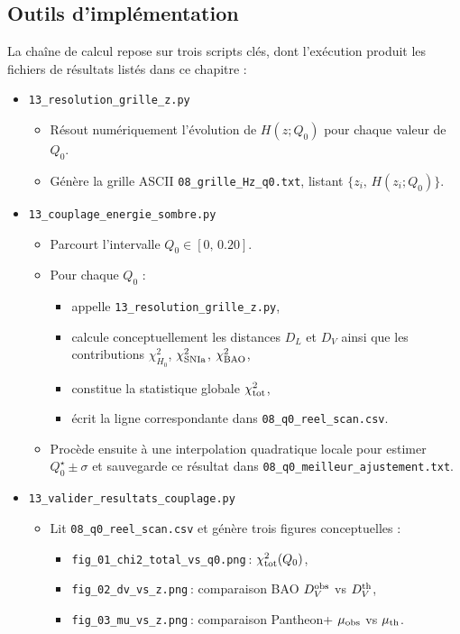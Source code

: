\subsection{Outils d’implémentation}

La chaîne de calcul repose sur trois scripts clés, dont l’exécution produit les fichiers de résultats listés dans ce chapitre :

\begin{itemize}
  \item \texttt{13\_resolution\_grille\_z.py}  
    \begin{itemize}
      \item Résout numériquement l’évolution de \(H(z;Q_{0})\) pour chaque valeur de \(Q_{0}\).  
      \item Génère la grille ASCII \texttt{08\_grille\_Hz\_q0.txt}, listant \(\{z_{i},\,H(z_{i};Q_{0})\}\).  
    \end{itemize}

  \item \texttt{13\_couplage\_energie\_sombre.py}  
    \begin{itemize}
      \item Parcourt l’intervalle \(Q_{0}\in[0,\,0.20]\).  
      \item Pour chaque \(Q_{0}\) :  
        \begin{itemize}
          \item appelle \texttt{13\_resolution\_grille\_z.py},  
          \item calcule conceptuellement les distances \(D_{L}\) et \(D_{V}\) ainsi que les contributions \(\chi^{2}_{H_{0}}\), \(\chi^{2}_{\rm SNIa}\), \(\chi^{2}_{\rm BAO}\),  
          \item constitue la statistique globale \(\chi^{2}_{\rm tot}\),  
          \item écrit la ligne correspondante dans \texttt{08\_q0\_reel\_scan.csv}.  
        \end{itemize}
      \item Procède ensuite à une interpolation quadratique locale pour estimer  
        \(Q_{0}^{\star}\pm\sigma\) et sauvegarde ce résultat dans  
        \texttt{08\_q0\_meilleur\_ajustement.txt}.  
    \end{itemize}

  \item \texttt{13\_valider\_resultats\_couplage.py}  
    \begin{itemize}
      \item Lit \texttt{08\_q0\_reel\_scan.csv} et génère trois figures conceptuelles :  
        \begin{itemize}
          \item \texttt{fig\_01\_chi2\_total\_vs\_q0.png} : \(\chi^{2}_{\rm tot}(Q_{0})\),  
          \item \texttt{fig\_02\_dv\_vs\_z.png} : comparaison BAO \(D_{V}^{\rm obs}\) vs \(D_{V}^{\rm th}\),  
          \item \texttt{fig\_03\_mu\_vs\_z.png} : comparaison Pantheon+ \(\mu_{\rm obs}\) vs \(\mu_{\rm th}\).  
        \end{itemize}
    \end{itemize}
\end{itemize}

